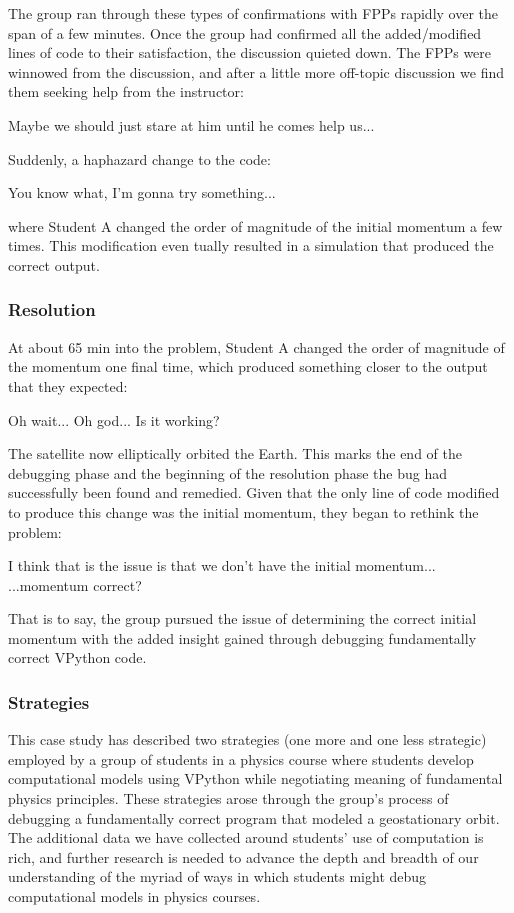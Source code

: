 \documentclass{msuphddissertation}
\begin{document}
\begin{doublespace}
The group ran through these types of confirmations with FPPs rapidly over the span of a few minutes. Once the group had confirmed all the added/modified lines of code to their satisfaction, the discussion quieted down. The FPPs were winnowed from the discussion, and after a little more off-topic discussion we find them seeking help from the instructor:\begin{description}
\SD  Maybe we should just stare at him until he comes help us...\end{description} Suddenly, a haphazard change to the code:\begin{description}
\SA You know what, I'm gonna try something... \end{description} where Student A changed the order of magnitude of the initial momentum a few times. This modification even tually resulted in a simulation that produced the correct output.

\subsubsection{Resolution}

At about 65 min into the problem, Student A changed the order of magnitude of the momentum one final time, which produced something closer to the output that they expected: \begin{description}
\SA Oh wait... Oh god...
\SD Is it working?\end{description}  The satellite now elliptically orbited the Earth. This marks the end of the debugging phase and the beginning of the resolution phase the bug had successfully been found and remedied. Given that the only line of code modified to produce this change was the initial momentum, they began to rethink the problem:\begin{description}\SD I think that is the issue is that we don't have the initial momentum...
\SA ...momentum correct?\end{description}  That is to say, the group pursued the issue of determining the correct initial momentum with the added insight gained through debugging fundamentally correct VPython code.

\subsubsection{Strategies}

This case study has described two strategies (one more and one less strategic) employed by a group of students in a physics course where students develop computational models using VPython while negotiating meaning of fundamental physics principles. These strategies arose through the group's process of debugging a fundamentally correct program that modeled a geostationary orbit. The additional data we have collected around students' use of computation is rich, and further research is needed to advance the depth and breadth of our understanding of the myriad of ways in which students might debug computational models in physics courses.


\end{doublespace}
\end{document}
